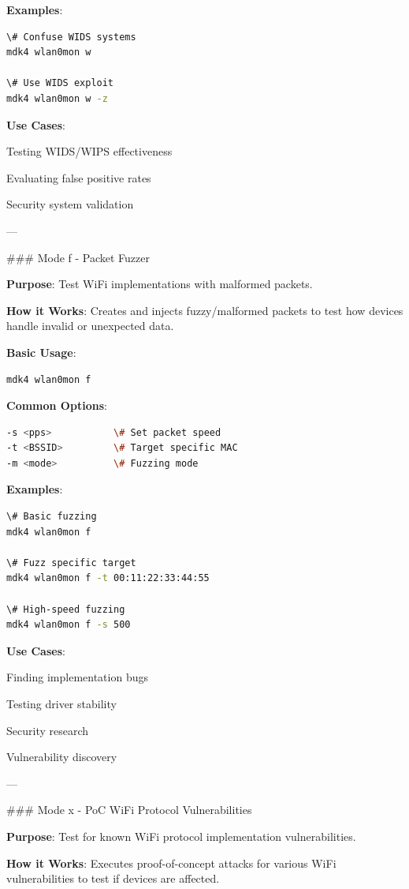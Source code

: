 \documentclass[11pt,a4paper]{article}
\begin{document}
\textbf{Examples}:
\begin{lstlisting}[language=bash]
\# Confuse WIDS systems
mdk4 wlan0mon w

\# Use WIDS exploit
mdk4 wlan0mon w -z
\end{lstlisting}

\textbf{Use Cases}:
\item Testing WIDS/WIPS effectiveness
\item Evaluating false positive rates
\item Security system validation

---

\#\#\# Mode f - Packet Fuzzer

\textbf{Purpose}: Test WiFi implementations with malformed packets.

\textbf{How it Works}: Creates and injects fuzzy/malformed packets to test how devices handle invalid or unexpected data.

\textbf{Basic Usage}:
\begin{lstlisting}[language=bash]
mdk4 wlan0mon f
\end{lstlisting}

\textbf{Common Options}:
\begin{lstlisting}[language=bash]
-s <pps>           \# Set packet speed
-t <BSSID>         \# Target specific MAC
-m <mode>          \# Fuzzing mode
\end{lstlisting}

\textbf{Examples}:
\begin{lstlisting}[language=bash]
\# Basic fuzzing
mdk4 wlan0mon f

\# Fuzz specific target
mdk4 wlan0mon f -t 00:11:22:33:44:55

\# High-speed fuzzing
mdk4 wlan0mon f -s 500
\end{lstlisting}

\textbf{Use Cases}:
\item Finding implementation bugs
\item Testing driver stability
\item Security research
\item Vulnerability discovery

---

\#\#\# Mode x - PoC WiFi Protocol Vulnerabilities

\textbf{Purpose}: Test for known WiFi protocol implementation vulnerabilities.

\textbf{How it Works}: Executes proof-of-concept attacks for various WiFi vulnerabilities to test if devices are affected.
\end{document}
